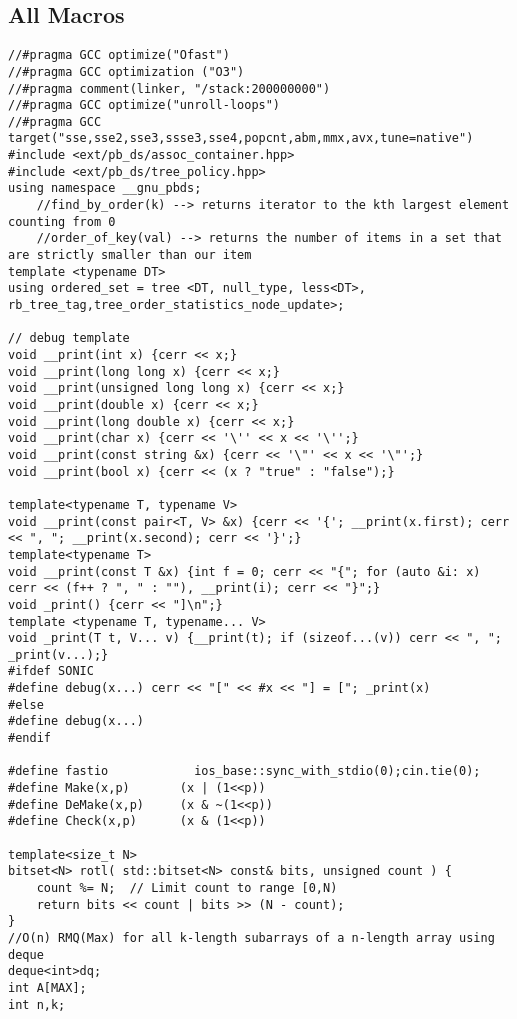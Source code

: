 \documentclass[FSZ,a4paper,onesided]{article}
\begin{document}
\begin{multicols*}{\COLS}
\tableofcontents
\newpage
{}


\section{All Macros}
\begin{lstlisting}
//#pragma GCC optimize("Ofast")
//#pragma GCC optimization ("O3")
//#pragma comment(linker, "/stack:200000000")
//#pragma GCC optimize("unroll-loops")
//#pragma GCC target("sse,sse2,sse3,ssse3,sse4,popcnt,abm,mmx,avx,tune=native")
#include <ext/pb_ds/assoc_container.hpp>
#include <ext/pb_ds/tree_policy.hpp>
using namespace __gnu_pbds;
    //find_by_order(k) --> returns iterator to the kth largest element counting from 0
    //order_of_key(val) --> returns the number of items in a set that are strictly smaller than our item
template <typename DT> 
using ordered_set = tree <DT, null_type, less<DT>, rb_tree_tag,tree_order_statistics_node_update>;

// debug template
void __print(int x) {cerr << x;}
void __print(long long x) {cerr << x;}
void __print(unsigned long long x) {cerr << x;}
void __print(double x) {cerr << x;}
void __print(long double x) {cerr << x;}
void __print(char x) {cerr << '\'' << x << '\'';}
void __print(const string &x) {cerr << '\"' << x << '\"';}
void __print(bool x) {cerr << (x ? "true" : "false");}

template<typename T, typename V>
void __print(const pair<T, V> &x) {cerr << '{'; __print(x.first); cerr << ", "; __print(x.second); cerr << '}';}
template<typename T>
void __print(const T &x) {int f = 0; cerr << "{"; for (auto &i: x) cerr << (f++ ? ", " : ""), __print(i); cerr << "}";}
void _print() {cerr << "]\n";}
template <typename T, typename... V>
void _print(T t, V... v) {__print(t); if (sizeof...(v)) cerr << ", "; _print(v...);}
#ifdef SONIC
#define debug(x...) cerr << "[" << #x << "] = ["; _print(x)
#else
#define debug(x...)
#endif

#define fastio            ios_base::sync_with_stdio(0);cin.tie(0);
#define Make(x,p)       (x | (1<<p))
#define DeMake(x,p)     (x & ~(1<<p))
#define Check(x,p)      (x & (1<<p))

template<size_t N>
bitset<N> rotl( std::bitset<N> const& bits, unsigned count ) {
    count %= N;  // Limit count to range [0,N)
    return bits << count | bits >> (N - count);
}
//O(n) RMQ(Max) for all k-length subarrays of a n-length array using deque
deque<int>dq;
int A[MAX];
int n,k;


\end{lstlisting}
\end{multicols*}
\end{document}
